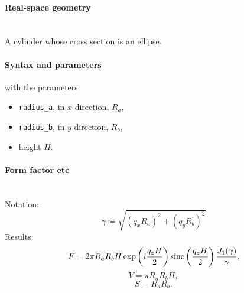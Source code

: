 \paragraph{Real-space geometry}\strut\\
A cylinder whose cross section is an ellipse.

\begin{figure}[h]
\hfill
{}
\hfill
{}
\hfill
{}
\hfill
\end{figure}

\paragraph{Syntax and parameters}
\begin{quote}
\end{quote}
with the parameters
\begin{itemize}
\item \texttt{radius\_a}, in $x$ direction, $R_a$,
\item \texttt{radius\_b}, in $y$ direction, $R_b$,
\item height $H$.
\end{itemize}


\paragraph{Form factor etc}\strut\\
Notation:
\begin{equation*}
  \gamma \coloneqq \sqrt{(q_x R_a)^2+(q_y R_b)^2}  
\end{equation*}
Results:
\begin{equation*}
F = 2\pi R_a R_b H \exp\left(i\frac{q_z H}{2}\right)
   \operatorname{sinc}\left(\frac{q_z H}{2}\right) \frac{J_1(\gamma)}{\gamma},
\end{equation*}
\begin{equation*}
  V = \pi R_a R_bH,
\end{equation*}
\begin{equation*}
  S = R_a R_b.
\end{equation*}


